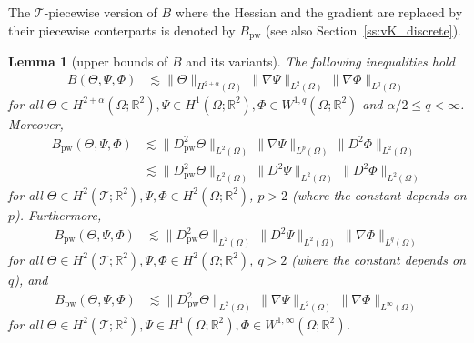 \documentclass[a4paper]{amsart}
\newtheorem{lemma}[theorem]{Lemma}
\theoremstyle{definition}
\numberwithin{equation}{section}
\numberwithin{theorem}{section}
\newcommand{\R}{\mathbb{R}}
\newcommand{\pw}{\mathrm{pw}}
\newcommand{\tri}{\mathcal{T}}
\begin{document}
The $\tri$-piecewise version of $B$ where the Hessian and the gradient 
are replaced by their piecewise conterparts is denoted by $B_\pw$
(see also Section~\ref{ss:vK_discrete}).
\begin{lemma}[upper bounds of $B$ and its variants] \label{l:vK_cont_B}
    The following inequalities hold 
    \begin{align}
        B(\Theta,\Psi,\Phi)
            &\lesssim \lVert\Theta\rVert_{H^{2+\alpha}(\Omega)}
                     \,\lVert\nabla\Psi\rVert_{L^2(\Omega)}
                     \,\lVert\nabla\Phi\rVert_{L^q(\Omega)}
        \label{e:vK_cont_B_2alpha2q}
    \end{align}
    for all $\Theta\in H^{2+\alpha}(\Omega;\R^2), 
               \Psi\in H^1(\Omega;\R^2),\Phi\in W^{1,q}(\Omega;\R^2)$
    and $\alpha/2\leq q<\infty$.
    Moreover,
    \begin{align}
        B_\pw(\Theta,\Psi,\Phi)
            & \lesssim \lVert D^2_\pw\Theta\rVert_{L^2(\Omega)}
                     \,\lVert\nabla\Psi\rVert_{L^p(\Omega)}
                     \,\lVert D^2\Phi\rVert_{L^2(\Omega)}
        \label{e:vK_cont_B_2p2}\\
            &\lesssim \lVert D^2_\pw\Theta\rVert_{L^2(\Omega)}
                     \,\lVert D^2\Psi\rVert_{L^2(\Omega)}
                     \,\lVert D^2\Phi\rVert_{L^2(\Omega)}
        \label{e:vK_cont_B_222}
    \end{align}
    for all $\Theta\in H^2(\tri;\R^2),\Psi,\Phi\in H^2(\Omega;\R^2)$,
    $p>2$ (where the constant depends on $p$). Furthermore,
    \begin{align}
        B_\pw(\Theta,\Psi,\Phi)
            & \lesssim \lVert D^2_\pw\Theta\rVert_{L^2(\Omega)}
                     \,\lVert D^2\Psi\rVert_{L^2(\Omega)}
                     \,\lVert \nabla\Phi\rVert_{L^q(\Omega)}
        \label{e:vK_cont_B_22q}
    \end{align}
    for all $\Theta\in H^{2}(\tri;\R^2), \Psi,\Phi\in H^2(\Omega;\R^2)$, 
    $q>2$ (where the constant depends on $q$), and
    \begin{align}
        B_\pw(\Theta,\Psi,\Phi)
            & \lesssim \lVert D^2_\pw\Theta\rVert_{L^2(\Omega)}
                     \,\lVert \nabla \Psi\rVert_{L^2(\Omega)}
                     \,\lVert \nabla\Phi\rVert_{L^\infty(\Omega)}
        \label{e:vK_cont_B_22infty}
    \end{align}
    for all $\Theta\in H^{2}(\tri;\R^2), \Psi\in H^1(\Omega;\R^2), 
    \Phi\in W^{1,\infty}(\Omega;\R^2)$.
\end{lemma}
\end{document}

